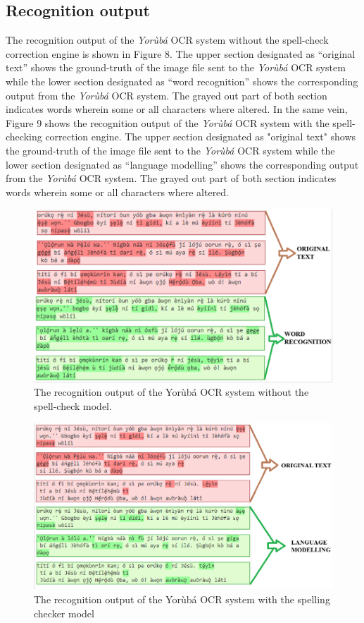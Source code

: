 \documentclass[review]{elsarticle}
\newcommand{\q}[1]{``#1''}
\newcommand{\yor}{\textit{Yor\`ub\'a }}
\begin{document}
\subsection{Recognition output}
The recognition output of the \yor OCR system without the spell-check correction engine is shown in Figure 8. The upper section designated as \q{original text} shows the ground-truth of the image file sent to the \yor OCR system while the lower section designated as \q{word recognition} shows the corresponding output from the \yor OCR system. The grayed out part of both section indicates words wherein some or all characters where altered. In the same vein, Figure 9 shows the recognition output of the \yor OCR system with the spell-checking correction engine. The upper section designated as "original text" shows the ground-truth of the image file sent to the \yor OCR system while the lower section designated as \q{language modelling} shows the corresponding output from the \yor OCR system. The grayed out part of both section indicates words wherein some or all characters where altered.

\begin{figure}
\centering
\includegraphics[width=0.7\linewidth]{combineResult1}
\caption{The recognition output of the Yor\`{u}b\'{a} OCR system without the spell-check model.}
\label{fig:combineresult1}
\end{figure}

\begin{figure}
\centering
\includegraphics[width=0.7\linewidth]{combineResult2}
\caption{The recognition output of the Yor\`{u}b\'{a} OCR system with the spelling checker model}
\label{fig:combineresult1}
\end{figure}
\end{document}
